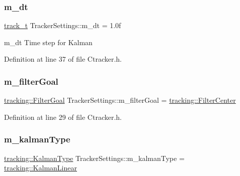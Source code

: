 \mbox{\label{struct_tracker_settings_ae876ad4f3599a782cddb37e318430aaa}} 
\subsubsection{\texorpdfstring{m\+\_\+dt}{m\_dt}}
{\footnotesize\ttfamily \mbox{\hyperlink{defines_8h_a7ce9c8817b42ab418e61756f579549ab}{track\+\_\+t}} Tracker\+Settings\+::m\+\_\+dt = 1.\+0f}



m\+\_\+dt Time step for Kalman 



Definition at line 37 of file Ctracker.\+h.

\mbox{\label{struct_tracker_settings_afd6c83aa8b0eaa4f131f45852a0b89e4}} 
\subsubsection{\texorpdfstring{m\+\_\+filter\+Goal}{m\_filterGoal}}
{\footnotesize\ttfamily \mbox{\hyperlink{namespacetracking_a9b3e7d16c86cd8b781ab214e396b0ebf}{tracking\+::\+Filter\+Goal}} Tracker\+Settings\+::m\+\_\+filter\+Goal = \mbox{\hyperlink{namespacetracking_a9b3e7d16c86cd8b781ab214e396b0ebfafac394783c1196957768400bc53ba491}{tracking\+::\+Filter\+Center}}}



Definition at line 29 of file Ctracker.\+h.

\mbox{\label{struct_tracker_settings_a3856a809067135c1c3f2d3c61fc4d6b7}} 
\subsubsection{\texorpdfstring{m\+\_\+kalman\+Type}{m\_kalmanType}}
{\footnotesize\ttfamily \mbox{\hyperlink{namespacetracking_a83f2c4d58ea2737f7d6296dce3eb722a}{tracking\+::\+Kalman\+Type}} Tracker\+Settings\+::m\+\_\+kalman\+Type = \mbox{\hyperlink{namespacetracking_a83f2c4d58ea2737f7d6296dce3eb722aa889eca583e371386c92e05814797a885}{tracking\+::\+Kalman\+Linear}}}



